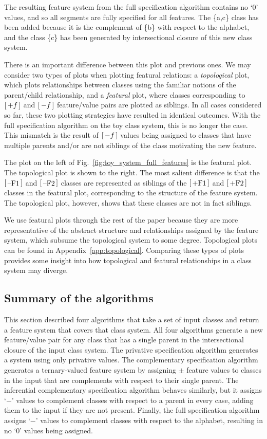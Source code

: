 \documentclass[12pt, oneside]{article}   	%
\newcommand{\featmat}[1]
{$\begin{bsmallmatrix*}[l]\text{\normalsize #1}\end{bsmallmatrix*}$}
\begin{document}
The resulting feature system from the full specification algorithm contains no `0' values, and so all segments are fully specified for all features. The \{a,c\} class has been added because it is the complement of \{b\} with respect to the alphabet, and the class \{c\} has been generated by intersectional closure of this new class system.

There is an important difference between this plot and previous ones. We may consider two types of plots when plotting featural relations: a \emph{topological} plot, which plots relationships between classes using the familiar notions of the parent/child relationship, and a \emph{featural} plot, where classes corresponding to \featmat{$+f$} and \featmat{$-f$} feature/value pairs are plotted as siblings. In all cases considered so far, these two plotting strategies have resulted in identical outcomes. With the full specification algorithm on the toy class system, this is no longer the case. This mismatch is the result of \featmat{$-f$} values being assigned to classes that have multiple parents and/or are not siblings of the class motivating the new feature.

The plot on the left of Fig.~\ref{fig:toy_system_full_features} is the featural plot. The topological plot is shown to the right. The most salient difference is that the \featmat{--F1} and \featmat{--F2} classes are represented as siblings of the \featmat{+F1} and \featmat{+F2} classes in the featural plot, corresponding to the structure of the feature system. The topological plot, however, shows that these classes are not in fact siblings.

We use featural plots through the rest of the paper because they are more representative of the abstract structure and relationships assigned by the feature system, which subsume the topological system to some degree. Topological plots can be found in Appendix~\ref{app:topological}. Comparing these types of plots provides some insight into how topological and featural relationships in a class system may diverge.

\subsection{Summary of the algorithms}

This section described four algorithms that take a set of input classes and return a feature system that covers that class system. All four algorithms generate a new feature/value pair for any class that has a single parent in the intersectional closure of the input class system. The privative specification algorithm generates a system using only privative values. The complementary specification algorithm generates a ternary-valued feature system by assigning $\pm$ feature values to classes in the input that are complements with respect to their single parent. The inferential complementary specification algorithm behaves similarly, but it assigns `$-$' values to complement classes with respect to a parent in every case, adding them to the input if they are not present. Finally, the full specification algorithm assigns `$-$' values to complement classes with respect to the alphabet, resulting in no `0' values being assigned.
\end{document}
